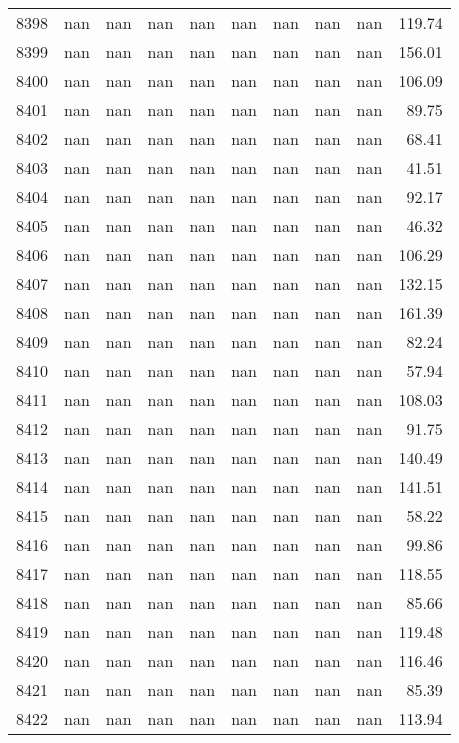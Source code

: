 \begin{tabular}{lrrrrrrrrr}
8398 & nan & nan & nan & nan & nan & nan & nan & nan & 119.74 \\
8399 & nan & nan & nan & nan & nan & nan & nan & nan & 156.01 \\
8400 & nan & nan & nan & nan & nan & nan & nan & nan & 106.09 \\
8401 & nan & nan & nan & nan & nan & nan & nan & nan & 89.75 \\
8402 & nan & nan & nan & nan & nan & nan & nan & nan & 68.41 \\
8403 & nan & nan & nan & nan & nan & nan & nan & nan & 41.51 \\
8404 & nan & nan & nan & nan & nan & nan & nan & nan & 92.17 \\
8405 & nan & nan & nan & nan & nan & nan & nan & nan & 46.32 \\
8406 & nan & nan & nan & nan & nan & nan & nan & nan & 106.29 \\
8407 & nan & nan & nan & nan & nan & nan & nan & nan & 132.15 \\
8408 & nan & nan & nan & nan & nan & nan & nan & nan & 161.39 \\
8409 & nan & nan & nan & nan & nan & nan & nan & nan & 82.24 \\
8410 & nan & nan & nan & nan & nan & nan & nan & nan & 57.94 \\
8411 & nan & nan & nan & nan & nan & nan & nan & nan & 108.03 \\
8412 & nan & nan & nan & nan & nan & nan & nan & nan & 91.75 \\
8413 & nan & nan & nan & nan & nan & nan & nan & nan & 140.49 \\
8414 & nan & nan & nan & nan & nan & nan & nan & nan & 141.51 \\
8415 & nan & nan & nan & nan & nan & nan & nan & nan & 58.22 \\
8416 & nan & nan & nan & nan & nan & nan & nan & nan & 99.86 \\
8417 & nan & nan & nan & nan & nan & nan & nan & nan & 118.55 \\
8418 & nan & nan & nan & nan & nan & nan & nan & nan & 85.66 \\
8419 & nan & nan & nan & nan & nan & nan & nan & nan & 119.48 \\
8420 & nan & nan & nan & nan & nan & nan & nan & nan & 116.46 \\
8421 & nan & nan & nan & nan & nan & nan & nan & nan & 85.39 \\
8422 & nan & nan & nan & nan & nan & nan & nan & nan & 113.94 \\

\end{tabular}
